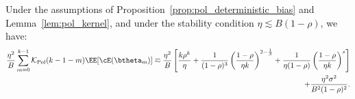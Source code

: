 \begin{proposition}
\label{prop:pol_self_noise_bounds}
Under the assumptions of Proposition~\ref{prop:pol_deterministic_bias} and Lemma~\ref{lem:pol_kernel}, and under the stability condition $\eta\lesssim B(1-\rho)$, we have:
\begin{align*}
    \frac{\eta^2}{B}\sum_{m=0}^{k-1}\mathcal{K}_{\mathrm{Pol}}(k-1-m)\EE[\cE(\btheta_m)]
    \eqsim
    \frac{\eta^2}{B} \left[ \frac{k\rho^k}{\eta} + \frac{1}{(1-\rho)^3} \left(\frac{1-\rho}{\eta k}\right)^{2-\frac{1}{\beta}} + \frac{1}{\eta(1-\rho)} \left(\frac{1-\rho}{\eta k}\right)^s \right]\\
    + \frac{\eta^2\sigma^2}{B^2(1-\rho)^2}.
\end{align*}
\end{proposition}

